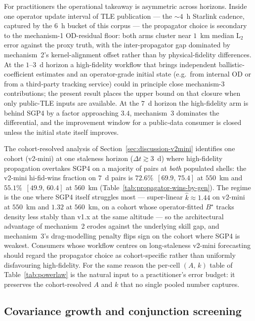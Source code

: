 \documentclass[10pt, letterpaper]{article}
\begin{document}
For practitioners the operational takeaway is asymmetric across
horizons. Inside one operator update interval of TLE publication
--- the $\sim 4$~h Starlink cadence, captured by the $6$~h bucket
of this corpus --- the propagator choice is secondary to the
mechanism-1 OD-residual floor: both arms cluster near $1$~km median
L$_{2}$ error against the proxy truth, with the inter-propagator
gap dominated by mechanism~2's kernel-alignment offset rather than
by physical-fidelity differences. At the $1$--$3$~d horizon a
high-fidelity workflow that brings independent ballistic-coefficient
estimates and an operator-grade initial state (e.g.\ from internal
OD or from a third-party tracking service) could in principle close
mechanism-3 contributions; the present result places the upper
bound on that closure when only public-TLE inputs are available.
At the $7$~d horizon the high-fidelity arm is behind SGP4 by a
factor approaching $3.4$, mechanism~3 dominates the differential,
and the improvement window for a public-data consumer is closed
unless the initial state itself improves.

The cohort-resolved analysis of
Section~\ref{sec:discussion-v2mini} identifies one cohort
(v2-mini) at one staleness horizon ($\Delta t \gtrsim 3$~d) where
high-fidelity propagation overtakes SGP4 on a majority of pairs
at \emph{both} populated shells: the v2-mini hi-fid-wins fraction
on $7$~d pairs is $72.6\%$~$[69.9,\,75.4]$ at $550$~km and
$55.1\%$~$[49.9,\,60.4]$ at $560$~km
(Table~\ref{tab:propagator-wins-by-gen}). The regime is the one
where SGP4 itself struggles most --- super-linear
$\hat k \approx 1.44$ on v2-mini at $550$~km and $1.32$ at
$560$~km, on a cohort whose operator-fitted $B^{\!\star}$ tracks
density less stably than v1.x at the same altitude --- so the
architectural advantage of mechanism~2 erodes against the
underlying skill gap, and mechanism~3's drag-modelling penalty
flips sign on the cohort where SGP4 is weakest. Consumers whose
workflow centres on long-staleness v2-mini forecasting should
regard the propagator choice as cohort-specific rather than
uniformly disfavouring high-fidelity. For the same reason the per-cell $(A,\,k)$ table
of Table~\ref{tab:powerlaw} is the natural input to a
practitioner's error budget: it preserves the cohort-resolved
$A$ and $k$ that no single pooled number captures.

\subsection{Covariance growth and conjunction screening}
\label{sec:discussion-covariance}
\end{document}
